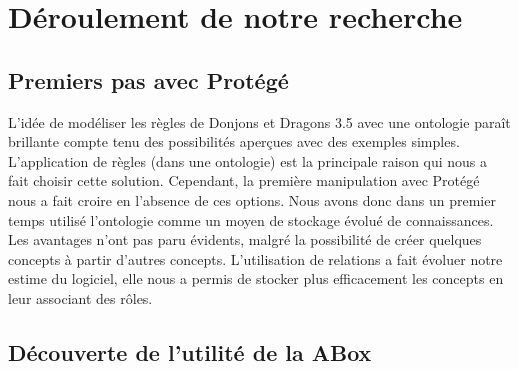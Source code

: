 

\section{Déroulement de notre recherche}
\label{sec:deroulement-de-notre}

\subsection{Premiers pas avec Protégé}
\label{sec:premiers-pas-avec}

\par L'idée de modéliser les règles de Donjons et Dragons 3.5 avec une ontologie paraît brillante compte tenu des possibilités aperçues avec des exemples simples. L'application de règles (dans une ontologie) est la principale raison qui nous a fait choisir cette solution. Cependant, la première manipulation avec Protégé nous a fait croire en l'absence de ces options. Nous avons donc dans un premier temps utilisé l'ontologie comme un moyen de stockage évolué de connaissances. Les avantages n'ont pas paru évidents, malgré la possibilité de créer quelques concepts à partir d'autres concepts. L'utilisation de relations a fait évoluer notre estime du logiciel, elle nous a permis de stocker plus efficacement les concepts en leur associant des rôles.

\subsection{Découverte de l'utilité de la ABox}
\label{sec:deco-de-lutil}

